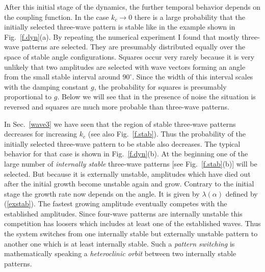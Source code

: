 After this initial stage of the dynamics, the further temporal
behavior depends on the coupling function. In the case $k_c\to 0$
there is a large probability that the initially selected three-wave
pattern is stable like in the example shown in Fig.~\ref{f.dyn}(a).
By repeating the numerical experiment I found that mostly three-wave 
patterns are selected. They are presumably distributed equally over 
the space of stable angle configurations. Squares occur very rarely
because it is very unlikely that two amplitudes are selected with
wave vectors forming an angle from the small stable interval around 
$90^\circ$. Since the width of this interval scales with the damping 
constant $g$, the probability for squares is presumably proportional 
to $g$. Below we will see that in the presence of noise the situation
is reversed and squares are much more probable than three-wave
patterns.

In Sec.~\ref{wave3} we have seen that the region of stable three-wave
patterns decreases for increasing $k_c$ (see also Fig.~\ref{f.stab}).
Thus the probability of the initially selected three-wave pattern to
be stable also decreases. The typical behavior for that case is shown
in Fig.~\ref{f.dyn}(b). At the beginning one of the large number of
{\em internally stable\/} three-wave patterns [see
Fig.~\ref{f.stab}(b)] will be selected. But because it is externally
unstable, amplitudes which have died out after the initial growth
become unstable again and grow. Contrary to the initial stage the
growth rate now depends on the angle. It is given by
$\lambda(\alpha)$ defined by (\ref{exstab}). The fastest growing
amplitude eventually competes with the established amplitudes.  Since
four-wave patterns are internally unstable this competition has 
loosers which includes at least one of the established waves. Thus
the system switches from one internally stable but externally
unstable pattern to another one which is at least internally stable.
Such a {\em pattern switching\/} is mathematically speaking a {\em
heteroclinic orbit\/} between two internally stable patterns. 

